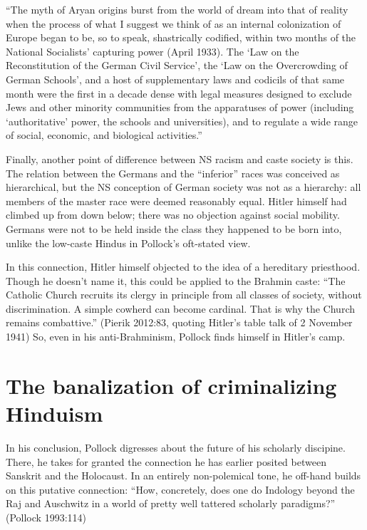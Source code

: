 \begin{myquote}
“The myth of Aryan origins burst from the world of dream into that of reality when the process of what I suggest we think of as an internal colonization of Europe began to be, so to speak, shastrically codified, within two months of the National Socialists' capturing power (April 1933). The ‘Law on the Reconstitution of the German Civil Service’, the ‘Law on the Overcrowding of German Schools’, and a host of supplementary laws and codicils of that same month were the first in a decade dense with legal measures designed to exclude Jews and other minority communities from the apparatuses of power (including ‘authoritative’ power, the schools and universities), and to regulate a wide range of social, economic, and biological activities.” 
\end{myquote}

Finally, another point of difference between NS racism and caste society is this. The relation between the Germans and the “inferior” races was conceived as hierarchical, but the NS conception of German society was not as a hierarchy: all members of the master race were deemed reasonably equal. Hitler himself had climbed up from down below; there was no objection against social mobility. Germans were not to be held inside the class they happened to be born into, unlike the low-caste Hindus in Pollock’s oft-stated view. 

In this connection, Hitler himself objected to the idea of a hereditary priesthood. Though he doesn’t name it, this could be applied to the Brahmin caste: “The Catholic Church recruits its clergy in principle from all classes of society, without discrimination. A simple cowherd can become cardinal. That is why the Church remains combattive.” (Pierik 2012:83, quoting Hitler’s table talk of 2 November 1941) So, even in his anti-Brahminism, Pollock finds himself in Hitler’s camp.

\section*{The banalization of criminalizing Hinduism}

In his conclusion, Pollock digresses about the future of his scholarly discipine. There, he takes for granted the connection he has earlier posited between Sanskrit and the Holocaust. In an entirely non-polemical tone, he off-hand builds on this putative connection: “How, concretely, does one do Indology beyond the Raj and Auschwitz in a world of pretty well tattered scholarly paradigms?” (Pollock 1993:114) 

